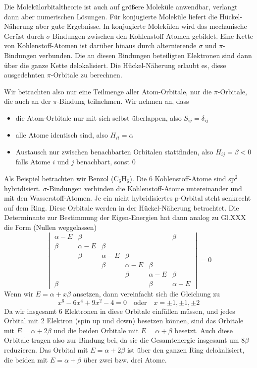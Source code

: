 Die Molekülorbitaltheorie ist auch auf größere Moleküle anwendbar, verlangt dann aber  numerischen Lösungen. Für konjugierte Moleküle liefert die Hückel-Näherung aber gute Ergebnisse. In konjugierte Molekülen wird das mechanische Gerüst durch $\sigma$-Bindungen zwischen den Kohlenstoff-Atomen gebildet. Eine Kette von Kohlenstoff-Atomen ist darüber hinaus durch alternierende $\sigma$ und $\pi$-Bindungen verbunden. Die an diesen Bindungen beteiligten Elektronen sind dann über die ganze Kette delokalisiert. Die Hückel-Näherung erlaubt es, diese ausgedehnten  $\pi$-Orbitale  zu berechnen.

Wir betrachten also nur eine Teilmenge aller Atom-Orbitale, nur die $\pi$-Orbitale, die auch an der $\pi$-Bindung teilnehmen. Wir nehmen an, dass
\begin{itemize} \setlength{\itemsep}{0pt}
\item die Atom-Orbitale nur mit sich selbst überlappen, also $S_{ij} = \delta_{ij}$
\item alle Atome identisch sind, also $H_{ii} = \alpha$
\item Austausch nur zwischen benachbarten Orbitalen stattfinden, also  $H_{ij} = \beta < 0 $ falls Atome $i$ und $j$ benachbart, sonst $0$ 
\end{itemize}

Als Beispiel betrachten wir Benzol (C$_6$H$_6$). Die 6 Kohlenstoff-Atome sind sp$^2$ hybridisiert. $\sigma$-Bindungen verbinden die Kohlenstoff-Atome untereinander und mit den Wasserstoff-Atomen. Je ein nicht hybridisiertes p-Orbital steht senkrecht auf dem Ring. Diese Orbitale werden in der Hückel-Näherung betrachtet. Die Determinante zur Bestimmung der Eigen-Energien hat dann analog zu Gl.XXX die Form (Nullen weggelassen)
\begin{equation}
 \begin{vmatrix}
  \alpha -E & \beta &  &  &  & \beta \\
  \beta & \alpha -E & \beta & & & \\
  & \beta & \alpha  -E& \beta & & \\
 &  & \beta & \alpha-E & \beta & \\
&  &  & \beta & \alpha -E& \beta \\
\beta & &  &  & \beta & \alpha -E
 \end{vmatrix} = 0
\end{equation}
Wenn wir $E = \alpha + x \beta$ ansetzen, dann vereinfacht sich die Gleichung zu 
\begin{equation}
x^6 - 6 x^4 + 9x^2 - 4 = 0 \quad \text{oder} \quad x = \pm 1, \pm 1, \pm 2
\end{equation}
Da wir insgesamt 6 Elektronen in diese Orbitale einfüllen müssen, und jedes Orbital mit 2 Elektron (spin up und down) besetzen können, sind das Orbitale mit $E=\alpha + 2 \beta$ und die beiden Orbitale mit $E = \alpha + \beta$ besetzt. Auch diese Orbitale tragen also zur Bindung bei, da sie die Gesamtenergie insgesamt um $8\beta$ reduzieren. Das Orbital mit $E=\alpha + 2 \beta$ ist über den ganzen Ring delokalisiert, die beiden mit $E = \alpha + \beta$  über zwei bzw. drei Atome.




